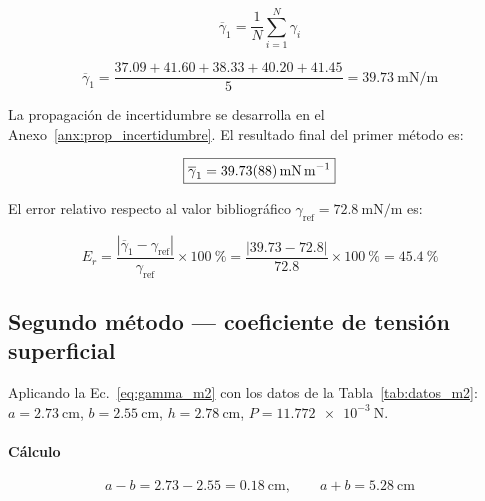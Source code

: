 \begin{equation}
    \overline{\gamma}_1 = \frac{1}{N}\sum_{i=1}^{N}\gamma_i
    \label{eq:t9_gamma_promedio}
\end{equation}

\begin{equation*}
    \overline{\gamma}_1
    = \frac{\num{37.09} + \num{41.60} + \num{38.33} + \num{40.20} + \num{41.45}}{5}
    = \qty{39.73}{\milli\newton\per\meter}
\end{equation*}

La propagación de incertidumbre se desarrolla en el
Anexo~\ref{anx:prop_incertidumbre}. El resultado final del primer
método es:

\begin{equation}
    \boxed{\overline{\gamma}_1 = \qty{39.73 \pm 0.88}{\milli\newton\per\meter}}
    \label{eq:t9_resultado_m1}
\end{equation}

El error relativo respecto al valor bibliográfico
$\gamma_{\text{ref}} = \qty{72.8}{\milli\newton\per\meter}$
\cite{serway} es:

\begin{equation*}
    E_r
    = \frac{|\overline{\gamma}_1 - \gamma_{\text{ref}}|}{\gamma_{\text{ref}}}
      \times \qty{100}{\percent}
    = \frac{|\num{39.73} - \num{72.8}|}{\num{72.8}} \times \qty{100}{\percent}
    = \qty{45.4}{\percent}
\end{equation*}

\subsection{Segundo método — coeficiente de tensión superficial}

Aplicando la Ec.~\eqref{eq:gamma_m2} con los datos de la
Tabla~\ref{tab:datos_m2}:
$a = \qty{2.73}{\centi\meter}$,
$b = \qty{2.55}{\centi\meter}$,
$h = \qty{2.78}{\centi\meter}$,
$P = \qty{11.772e-3}{\newton}$.

\paragraph{Cálculo}

\begin{equation*}
    a - b = \num{2.73} - \num{2.55} = \qty{0.18}{\centi\meter},
    \qquad
    a + b = \qty{5.28}{\centi\meter}
\end{equation*}

